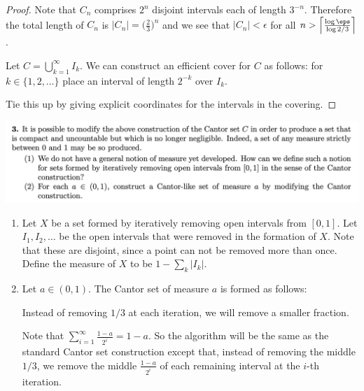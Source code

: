 \begin{enumerate}[label=(2.\arabic*)]
\begin{proof}
    Note that $C_n$ comprises $2^n$ disjoint intervals each of length $3^{-n}$. Therefore the total length
    of $C_n$ is $|C_n| = \big(\frac{2}{3}\big)^n$ and we see that $|C_n| < \epsilon$ for all $n > \Big\lceil\frac{\log\eps}{\log 2/3} \Big\rceil$.

    Let $C = \bigcup_{k=1}^\infty I_k$. We can construct an efficient cover for $C$ as follows:
    for $k \in \{1, 2, \ldots\}$ place an interval of length $2^{-k}$ over $I_k$.

     Tie this up by giving explicit coordinates for the intervals in the covering.
  \end{proof}

\end{enumerate}

\newpage
\begin{mdframed}
  \includegraphics[width=400pt]{img/analysis--berkeley-202a-6b7a.png}
\end{mdframed}

\begin{enumerate}[label=(3.\arabic*)]

\item
  \begin{definition*}
    Let $X$ be a set formed by iteratively removing open intervals from $[0, 1]$. Let $I_1, I_2, \ldots$ be the
    open intervals that were removed in the formation of $X$. Note that these are disjoint, since a point can
    not be removed more than once. Define the measure of $X$ to be $1 - \sum_k |I_k|$.
  \end{definition*}

\item
  \begin{definition*}
    Let $a \in (0, 1)$. The Cantor set of measure $a$ is formed as follows:

    Instead of removing $1/3$ at each iteration, we will remove a smaller fraction.

    Note that $\sum_{i=1}^\infty \frac{1 - a}{2^i} = 1 - a$. So the algorithm will be the same as the standard
    Cantor set construction except that, instead of removing the middle $1/3$, we remove the
    middle $\frac{1 - a}{2^i}$ of each remaining interval at the $i$-th iteration.
  \end{definition*}

\end{enumerate}



